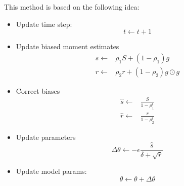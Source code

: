 This method is based on the following idea:
\begin{itemize}
    \item Update time step:
          \begin{equation}
              t \gets t + 1
          \end{equation}
    \item Update biased moment estimates
          \begin{equation}
              \begin{split}
                  s \gets & \rho_1 S + (1 - \rho_1)g          \\
                  r \gets & \rho_2 r + (1 - \rho_2) g \odot g
              \end{split}
          \end{equation}
    \item Correct biases
          \begin{equation}
              \begin{split}
                  \hat{s} \gets & \frac{S}{1 - \rho_1^t} \\
                  \hat{r} \gets & \frac{r}{1 - \rho_2^t}
              \end{split}
          \end{equation}
    \item Update parameters
          \begin{equation}
              \Delta \theta \gets - \epsilon \frac{\hat{s}}{\delta + \sqrt{\hat{r}}}
          \end{equation}
    \item Update model params:
          \begin{equation}
              \theta \gets \theta + \Delta \theta
          \end{equation}
\end{itemize}